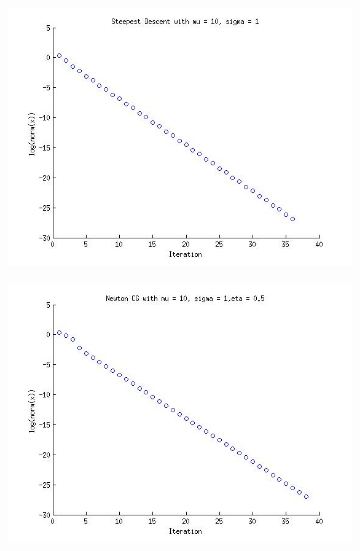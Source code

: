 \documentclass{article}
\begin{document}
%
\begin{figure}[!htb]
        \centering
        \begin{subfigure}[bh]{0.45\textwidth}
                \includegraphics[width=\textwidth]{figs/P3SDmu10sig1.jpg}
        \end{subfigure}%
        \begin{subfigure}[bh]{0.45\textwidth}
                \includegraphics[width=\textwidth]{figs/P3NCGmu10sig1eta1.jpg}
        \end{subfigure}
        \centering
        \begin{subfigure}[bh]{0.45\textwidth}

\end{subfigure}
\end{figure}
\end{document}
